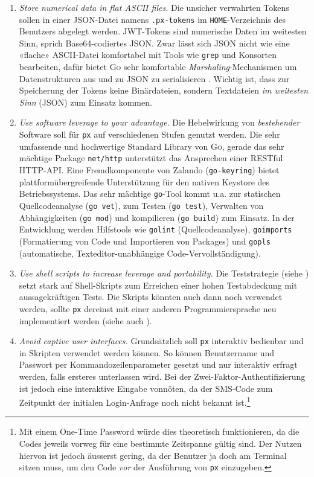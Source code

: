 \begin{enumerate}
    \item \textit{Store numerical data in flat ASCII files.} Die unsicher verwahrten Tokens sollen in einer JSON-Datei namens \texttt{.px-tokens} im \texttt{HOME}-Verzeichnis des Benutzers abgelegt werden. JWT-Tokens sind numerische Daten im weitesten Sinn, sprich Base64-codiertes JSON. Zwar lässt sich JSON nicht wie eine «flache» ASCII-Datei komfortabel mit Tools wie \texttt{grep} und Konsorten bearbeiten, dafür bietet \textsc{Go} sehr komfortable \textit{Marshaling}-Mechanismen um Datenstrukturen aus und zu JSON zu serialisieren \cite[Kapitel 4.5]{gopl}. Wichtig ist, dass zur Speicherung der Tokens keine Binärdateien, sondern Textdateien \textit{im weitesten Sinn} (JSON) zum Einsatz kommen.
    \item \textit{Use software leverage to your advantage.} Die Hebelwirkung von \textit{bestehender} Software soll für \texttt{px} auf verschiedenen Stufen genutzt werden. Die sehr umfassende und hochwertige Standard Library von \textsc{Go}, gerade das sehr mächtige Package \texttt{net/http} unterstützt das Ansprechen einer RESTful HTTP-API. Eine Fremdkomponente von Zalando (\texttt{go-keyring}) bietet plattformübergreifende Unterstützung für den nativen Keystore des Betriebssystems. Das sehr mächtige \texttt{go}-Tool kommt u.a. zur statischen Quellcodeanalyse (\texttt{go vet}), zum Testen (\texttt{go test}), Verwalten von Abhängigkeiten (\texttt{go mod}) und kompilieren (\texttt{go build}) zum Einsatz. In der Entwicklung werden Hilfstools wie \texttt{golint} (Quellcodeanalyse), \texttt{goimports} (Formatierung von Code und Importieren von Packages) und \texttt{gopls} (automatische, Texteditor-unabhängige Code-Vervollständigung).
    \item \textit{Use shell scripts to increase leverage and portability.} Die Teststrategie (siehe ) setzt stark auf Shell-Skripts zum Erreichen einer hohen Testabdeckung mit aussagekräftigen Tests. Die Skripts könnten auch dann noch verwendet werden, sollte \texttt{px} dereinst mit einer anderen Programmiersprache neu implementiert werden (siehe auch ).
    \item \textit{Avoid captive user interfaces.} Grundsätzlich soll \texttt{px} interaktiv bedienbar und in Skripten verwendet werden können. So können Benutzername und Passwort per Kommandozeilenparameter gesetzt und nur interaktiv erfragt werden, falls ersteres unterlassen wird. Bei der Zwei-Faktor-Authentifizierung ist jedoch eine interaktive Eingabe vonnöten, da der SMS-Code zum Zeitpunkt der initialen Login-Anfrage noch nicht bekannt ist.\footnote{Mit einem One-Time Password würde dies theoretisch funktionieren, da die Codes jeweils vorweg für eine bestimmte Zeitspanne gültig sind. Der Nutzen hiervon ist jedoch äusserst gering, da der Benutzer ja doch am Terminal sitzen muss, um den Code \textit{vor} der Ausführung von \texttt{px} einzugeben.}

\end{enumerate}
